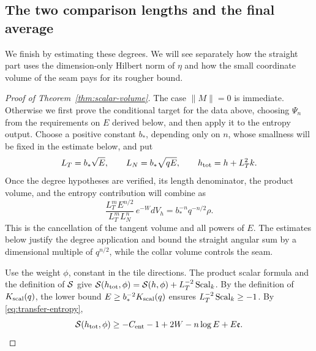 \subsection{The two comparison lengths and the final average}

We finish by estimating these degrees.  We will see separately how
the straight part uses the dimension-only Hilbert norm of \(\eta\)
and how the small coordinate volume of the seam pays for its rougher
bound.

\begin{proof}[Proof of Theorem~\ref{thm:scalar-volume}]
The case \(\|M\|=0\) is immediate.  Otherwise we first prove the
conditional target for the data above, choosing \(\Psi_n\) from the
requirements on \(E\) derived below, and then apply it to the entropy
output.  Choose a positive constant \(b_*\), depending only on \(n\),
whose smallness will be fixed in the estimate below, and put
\begin{equation}\label{eq:transfer-lengths}
       L_T=b_*\sqrt E,\qquad L_N=b_*\sqrt{qE},\qquad
                    h_{\rm tot}=h+L_T^2k.
\end{equation}
Once the degree hypotheses are verified, its length denominator, the
product volume, and the entropy contribution will combine as
\begin{equation}\label{eq:transfer-prefactor}
 \frac{L_T^mE^{n/2}}{L_T^mL_N^n}\,e^{-W}dV_h
                         =b_*^{-n}q^{-n/2}\rho.
\end{equation}
This is the cancellation of the tangent volume and all powers of
\(E\).  The estimates below justify the degree application and bound
the straight angular sum by a dimensional multiple of \(q^{n/2}\),
while the collar volume controls the seam.

Use the weight \(\phi\), constant in the tile directions.  The
product scalar formula and the definition of \(\mathcal S\) give
\(\mathcal S(h_{\rm tot},\phi)=\mathcal S(h,\phi)+L_T^{-2}\operatorname{Scal}_k\).
By the definition of \(K_{\rm scal}(q)\), the lower bound
\(E\geq b_*^{-2}K_{\rm scal}(q)\) ensures
\(L_T^{-2}\operatorname{Scal}_k\geq-1\).  By \eqref{eq:transfer-entropy},
\begin{equation}\label{eq:transfer-total-scalar}
 \mathcal S(h_{\rm tot},\phi)\geq-C_{\rm ent}-1+2W-n\log E+E\mathfrak e.
\end{equation}


\end{proof}
